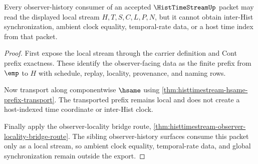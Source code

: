 \begin{theorem}
\label{thm:histtimestream-no-global-clock-nonescape}
Every observer-history consumer of an accepted $\HistTimeStreamUp$ packet may read the displayed local stream $H,T,S,C,L,P,N$, but it cannot obtain inter-Hist synchronization, ambient clock equality, temporal-rate data, or a host time index from that packet.
\end{theorem}
\begin{proof}
First expose the local stream through the carrier definition and Cont prefix exactness. These identify the observer-facing data as the finite prefix from $\emp$ to $H$ with schedule, replay, locality, provenance, and naming rows.

Now transport along componentwise $\hsame$ using \autoref{thm:histtimestream-hsame-prefix-transport}. The transported prefix remains local and does not create a host-indexed time coordinate or inter-Hist clock.

Finally apply the observer-locality bridge route, \autoref{thm:histtimestream-observer-locality-bridge-route}. The sibling observer-history surfaces consume this packet only as a local stream, so ambient clock equality, temporal-rate data, and global synchronization remain outside the export.
\end{proof}

